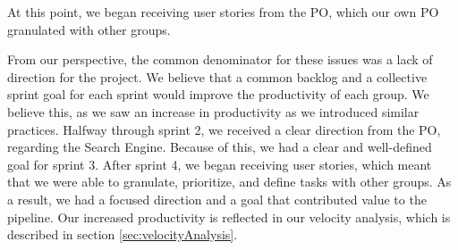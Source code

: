 At this point, we began receiving user stories from the \knox{} PO, which our own PO granulated with other \knox{} groups.

From our perspective, the common denominator for these issues was a lack of direction for the \knox{} project. We believe that a common backlog and a collective sprint goal for each \knox{} sprint would improve the productivity of each \knox{} group. We believe this, as we saw an increase in productivity as we introduced similar practices.
Halfway through sprint 2, we received a clear direction from the \knox{} PO, regarding the Search Engine. Because of this, we had a clear and well-defined goal for sprint 3.
After sprint 4, we began receiving user stories, which meant that we were able to granulate, prioritize, and define tasks with other groups. As a result, we had a focused direction and a goal that contributed value to the \knox{} pipeline.
Our increased productivity is reflected in our velocity analysis, which is described in section \ref{sec:velocityAnalysis}.




